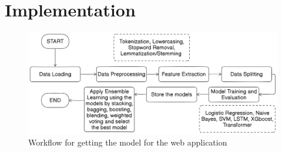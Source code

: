 

\section{Implementation}

\begin{figure}[h!]  
    \centering
    \includegraphics[width=1.0\textwidth]{Images/ML Model Workflow.png}  
    \caption*{Workflow for getting the model for the web application}
    \label{model workflow}  %
\end{figure}


